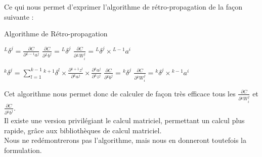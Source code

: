 \documentclass[10pt,a4paper]{report}
\newcommand{\lexp}[1]{\phantom{}^{#1}}
\newcommand{\elem}[4]{\lexp{#2}#1^{#3}_{#4}}
\begin{document}
				Ce qui nous permet d'exprimer l'algorithme de rétro-propagation de la façon suivante :
			\begin{algorithm}[H]
				\caption{Algorithme de Rétro-propagation}
				\begin{algorithmic}
				    \STATE
				    	\STATE $\elem{\delta}{L}{j}{} = \frac{\partial C}{\partial \elem{a}{L-1}{j}{}}$
				    	\STATE $\frac{\partial C}{\partial \elem{b}{L}{j}{}} = \elem{\delta}{L}{j}{}$
					    	\STATE $\frac{\partial C}{\partial \elem{W}{L}{j}{i}} = \elem{\delta}{L}{j}{} \times \elem{a}{L-1}{i}{}$
				    	\ENDFOR
				    \ENDFOR
				    
				    	\STATE
				    		\STATE $\elem{\delta}{k}{j}{} = \sum_{l=1}^{k-1}{\elem{\delta}{k+1}{l}{} \times \frac{\partial \elem{z}{k+1}{l}{}}{\partial \elem{a}{k}{j}{}} \times \frac{\partial \elem{a}{k}{j}{}}{\partial \elem{z}{k}{j}{}}}$
				    		\STATE $\frac{\partial C}{\partial \elem{b}{k}{j}{}} = \elem{\delta}{k}{j}{}$
					    		\STATE $\frac{\partial C}{\partial \elem{W}{k}{j}{i}} = \elem{\delta}{k}{j}{}  \times \elem{a}{k-1}{i}{}$
					    	\ENDFOR
				    	\ENDFOR
				    \ENDFOR
				    
				\end{algorithmic}
			\end{algorithm}
		Cet algorithme nous permet donc de calculer de façon très efficace tous les $\frac{\partial C}{\partial \elem{W}{k}{j}{i}}$ et $\frac{\partial C}{\partial \elem{b}{k}{j}{}}$.\\
		Il existe une version privilégiant le calcul matriciel, permettant un calcul plus rapide, grâce aux bibliothèques de calcul matriciel.\\
		Nous ne redémontrerons pas l'algorithme, mais nous en donneront toutefois la formulation.
\end{document}
